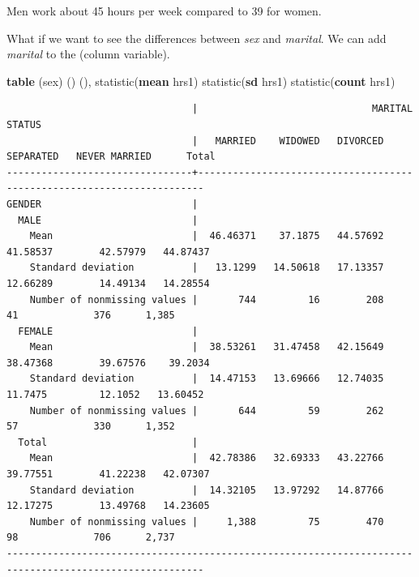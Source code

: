 \documentclass[
]{book}
\newenvironment{Shaded}{\begin{snugshade}}{\end{snugshade}}
\newcommand{\FunctionTok}[1]{\textcolor[rgb]{0.13,0.29,0.53}{\textbf{#1}}}
\newcommand{\KeywordTok}[1]{\textcolor[rgb]{0.13,0.29,0.53}{\textbf{#1}}}
\newcommand{\NormalTok}[1]{#1}
\begin{document}
Men work about 45 hours per week compared to 39 for women.

What if we want to see the differences between \emph{sex} and \emph{marital}. We can add \emph{marital} to the (column variable).

\begin{Shaded}
\begin{Highlighting}[]
\KeywordTok{table}\NormalTok{ (sex) () (), statistic(}\KeywordTok{mean}\NormalTok{ hrs1) statistic(}\FunctionTok{sd}\NormalTok{ hrs1) statistic(}\FunctionTok{count}\NormalTok{ hrs1)}
\end{Highlighting}
\end{Shaded}

\begin{verbatim}
                                |                              MARITAL STATUS                           
                                |   MARRIED    WIDOWED   DIVORCED   SEPARATED   NEVER MARRIED      Total
--------------------------------+-----------------------------------------------------------------------
GENDER                          |                                                                       
  MALE                          |                                                                       
    Mean                        |  46.46371    37.1875   44.57692    41.58537        42.57979   44.87437
    Standard deviation          |   13.1299   14.50618   17.13357    12.66289        14.49134   14.28554
    Number of nonmissing values |       744         16        208          41             376      1,385
  FEMALE                        |                                                                       
    Mean                        |  38.53261   31.47458   42.15649    38.47368        39.67576    39.2034
    Standard deviation          |  14.47153   13.69666   12.74035     11.7475         12.1052   13.60452
    Number of nonmissing values |       644         59        262          57             330      1,352
  Total                         |                                                                       
    Mean                        |  42.78386   32.69333   43.22766    39.77551        41.22238   42.07307
    Standard deviation          |  14.32105   13.97292   14.87766    12.17275        13.49768   14.23605
    Number of nonmissing values |     1,388         75        470          98             706      2,737
--------------------------------------------------------------------------------------------------------
\end{verbatim}
\end{document}
